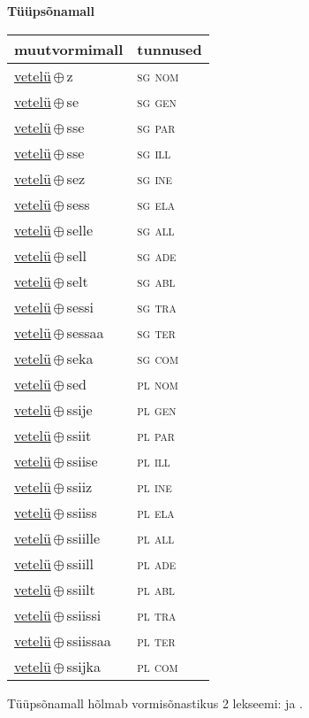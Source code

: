 

\vspace{3.5em}
\noindent \begin{minipage}{\textwidth}
\noindent \textbf{Tüüpsõnamall \,}\\

\begin{sideways}
\begin{tabular}{l l}
muutvormimall & tunnused \\
\hline
\underline{vetelü}\,$\oplus$\,z & \textsc{ sg nom } \\
\underline{vetelü}\,$\oplus$\,se & \textsc{ sg gen } \\
\underline{vetelü}\,$\oplus$\,sse & \textsc{ sg par } \\
\underline{vetelü}\,$\oplus$\,sse & \textsc{ sg ill } \\
\underline{vetelü}\,$\oplus$\,sez & \textsc{ sg ine } \\
\underline{vetelü}\,$\oplus$\,sess & \textsc{ sg ela } \\
\underline{vetelü}\,$\oplus$\,selle & \textsc{ sg all } \\
\underline{vetelü}\,$\oplus$\,sell & \textsc{ sg ade } \\
\underline{vetelü}\,$\oplus$\,selt & \textsc{ sg abl } \\
\underline{vetelü}\,$\oplus$\,sessi & \textsc{ sg tra } \\
\underline{vetelü}\,$\oplus$\,sessaa & \textsc{ sg ter } \\
\underline{vetelü}\,$\oplus$\,seka & \textsc{ sg com } \\
\underline{vetelü}\,$\oplus$\,sed & \textsc{ pl nom } \\
\underline{vetelü}\,$\oplus$\,ssije & \textsc{ pl gen } \\
\underline{vetelü}\,$\oplus$\,ssiit & \textsc{ pl par } \\
\underline{vetelü}\,$\oplus$\,ssiise & \textsc{ pl ill } \\
\underline{vetelü}\,$\oplus$\,ssiiz & \textsc{ pl ine } \\
\underline{vetelü}\,$\oplus$\,ssiiss & \textsc{ pl ela } \\
\underline{vetelü}\,$\oplus$\,ssiille & \textsc{ pl all } \\
\underline{vetelü}\,$\oplus$\,ssiill & \textsc{ pl ade } \\
\underline{vetelü}\,$\oplus$\,ssiilt & \textsc{ pl abl } \\
\underline{vetelü}\,$\oplus$\,ssiissi & \textsc{ pl tra } \\
\underline{vetelü}\,$\oplus$\,ssiissaa & \textsc{ pl ter } \\
\underline{vetelü}\,$\oplus$\,ssijka & \textsc{ pl com } \\
\end{tabular}
\end{sideways}
\label{tab:tüüpsõnamall-vetelüz}

\end{minipage}

 
\vspace{1em}
\noindent Tüüpsõnamall  hõlmab vormisõnastikus 2 lekseemi:  ja .
